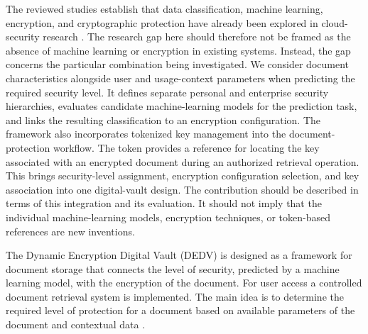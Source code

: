 \documentclass[pdflatex,sn-mathphys-num]{sn-jnl}
\begin{document}
The reviewed studies establish that data classification, machine learning, encryption, and
cryptographic protection have already been explored in cloud-security research
\cite{thabit2023data}. The research gap here should therefore not be framed as the absence of
machine learning or encryption in existing systems. Instead, the gap concerns the particular
combination being investigated. We consider document characteristics alongside user and
usage-context parameters when predicting the required security level. It defines separate personal
and enterprise security hierarchies, evaluates candidate machine-learning models for the
prediction task, and links the resulting classification to an encryption configuration. The
framework also incorporates tokenized key management into the document-protection workflow. The
token provides a reference for locating the key associated with an encrypted document during an
authorized retrieval operation. This brings security-level assignment, encryption configuration
selection, and key association into one digital-vault design. The contribution should be
described in terms of this integration and its evaluation. It should not imply that the
individual machine-learning models, encryption techniques, or token-based references are new
inventions.

The Dynamic Encryption Digital Vault (DEDV) is designed as a framework for document storage that
connects the level of security, predicted by a machine learning model, with the encryption of the
document. For user access a controlled document retrieval system is implemented. The main idea is
to determine the required level of protection for a document based on available parameters of the
document and contextual data \cite{sasikumar2025enhancing}.
\end{document}

